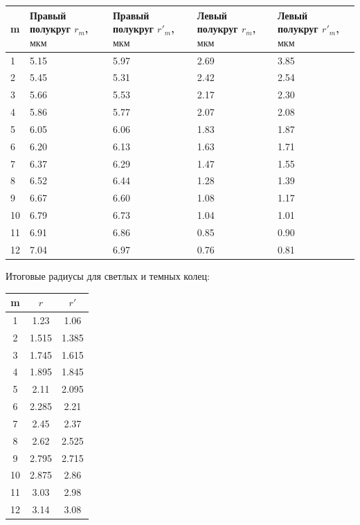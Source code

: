\documentclass[a4paper]{article}
\begin{document}
\begin{table}[h]
    \centering
    \begin{tabular}{|l|l|l|l|l|} %
        \hline
        \textbf{m} & Правый полукруг \textbf{ $r_m$, $\text{мкм}$} & Правый полукруг \textbf{$r'_m$, $\text{мкм}$} & Левый полукруг \textbf{ $r_m$, $\text{мкм}$}& Левый полукруг \textbf{$r'_m$, $\text{мкм}$}\\
        \hline
        1 & 5.15 & 5.97&2.69& 3.85  \\
        \hline
        2 & 5.45 & 5.31& 2.42& 2.54\\
        \hline
        3 & 5.66  & 5.53& 2.17& 2.30\\
        \hline
        4 & 5.86 &5.77& 2.07& 2.08 \\
        \hline
        5 &6.05 &6.06& 1.83& 1.87 \\
        \hline
        6 &6.20 &6.13& 1.63& 1.71\\
        \hline
        7 & 6.37 &6.29& 1.47& 1.55\\
        \hline
        8 & 6.52 &6.44& 1.28& 1.39\\
        \hline
        9 & 6.67 &6.60& 1.08& 1.17\\
        \hline
         10& 6.79 &6.73& 1.04& 1.01\\
         \hline
          11& 6.91 &6.86& 0.85& 0.90\\
          \hline
         12& 7.04 &6.97& 0.76& 0.81\\
        \hline
    \end{tabular}
\end{table}

Итоговые радиусы для светлых и темных колец: 

\begin{table}[h]
    \centering
    \begin{tabular}{|c|c|c|}
        \hline
        \textbf{m} & \textbf{$r$} & \textbf{$r'$} \\
        \hline
        1  & 1.23  & 1.06  \\ \hline
        2  & 1.515 & 1.385 \\ \hline
        3  & 1.745 & 1.615 \\ \hline
        4  & 1.895 & 1.845 \\ \hline
        5  & 2.11  & 2.095 \\ \hline
        6  & 2.285 & 2.21  \\ \hline
        7  & 2.45  & 2.37  \\ \hline
        8  & 2.62  & 2.525 \\ \hline
        9  & 2.795 & 2.715 \\ \hline
        10 & 2.875 & 2.86  \\ \hline
        11 & 3.03  & 2.98  \\ \hline
        12 & 3.14  & 3.08  \\ \hline
    \end{tabular}
\end{table}
\end{document}
